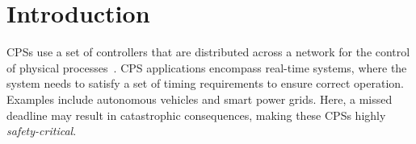 \section{Introduction}
\label{sec:intro}

\acp{CPS} use a set of controllers that are distributed across a network for the 
control of physical processes~\cite{alur2015principles}. \ac{CPS} applications encompass real-time systems, where 
the system needs to satisfy a set of timing requirements to ensure correct operation. Examples include autonomous vehicles and
smart power grids. Here, a missed deadline may result in catastrophic consequences, making these \acp{CPS} highly 
\textit{safety-critical}. 
